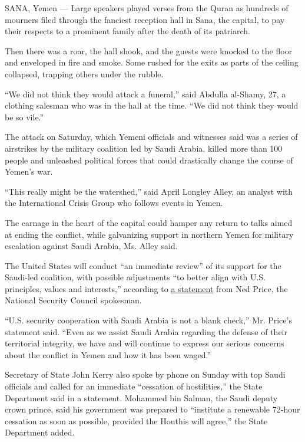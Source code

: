 SANA, Yemen --- Large speakers played verses from the Quran as hundreds
of mourners filed through the fanciest reception hall in Sana, the
capital, to pay their respects to a prominent family after the death of
its patriarch.

Then there was a roar, the hall shook, and the guests were knocked to
the floor and enveloped in fire and smoke. Some rushed for the exits as
parts of the ceiling collapsed, trapping others under the rubble.

``We did not think they would attack a funeral,'' said Abdulla al-Shamy,
27, a clothing salesman who was in the hall at the time. ``We did not
think they would be so vile.''

The attack on Saturday, which Yemeni officials and witnesses said was a
series of airstrikes by the military coalition led by Saudi Arabia,
killed more than 100 people and unleashed political forces that could
drastically change the course of Yemen's war.

``This really might be the watershed,'' said April Longley Alley, an
analyst with the International Crisis Group who follows events in Yemen.

The carnage in the heart of the capital could hamper any return to talks
aimed at ending the conflict, while galvanizing support in northern
Yemen for military escalation against Saudi Arabia, Ms. Alley said.

The United States will conduct ``an immediate review'' of its support
for the Saudi-led coalition, with possible adjustments ``to better align
with U.S. principles, values and interests,'' according to
\href{https://www.whitehouse.gov/the-press-office/2016/10/08/statement-nsc-spokesperson-ned-price-yemen}{a
statement} from Ned Price, the National Security Council spokesman.

``U.S. security cooperation with Saudi Arabia is not a blank check,''
Mr. Price's statement said. ``Even as we assist Saudi Arabia regarding
the defense of their territorial integrity, we have and will continue to
express our serious concerns about the conflict in Yemen and how it has
been waged.''

Secretary of State John Kerry also spoke by phone on Sunday with top
Saudi officials and called for an immediate ``cessation of
hostilities,'' the State Department said in a statement. Mohammed bin
Salman, the Saudi deputy crown prince, said his government was prepared
to ``institute a renewable 72-hour cessation as soon as possible,
provided the Houthis will agree,'' the State Department added.

